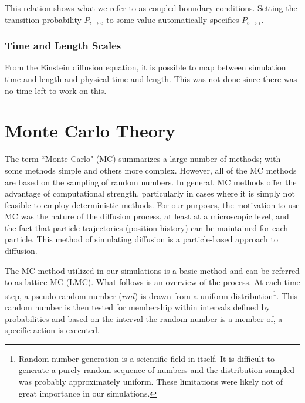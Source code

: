 	This relation shows what we refer to as coupled boundary conditions. Setting the transition probability $ P_{i \rightarrow e} $ to some value automatically specifies $ P_{e \rightarrow i} $.

\subsubsection{Time and Length Scales}

	From the Einstein diffusion equation, it is possible to map between simulation time and length and physical time and length. This was not done since there was no time left to work on this.

\clearpage
\section{Monte Carlo Theory}
\label{sec:intro-mc}
	
	The term ``Monte Carlo" (MC) summarizes a large number of methods; with some methods simple and others more complex. However, all of the MC methods are based on the sampling of random numbers. In general, MC methods offer the advantage of computational strength, particularly in cases where it is simply not feasible to employ deterministic methods. For our purposes, the motivation to use MC was the nature of the diffusion process, at least at a microscopic level, and the fact that particle trajectories (position history) can be maintained for each particle. This method of simulating diffusion is a particle-based approach to diffusion.
	
	The MC method utilized in our simulations is a basic method and can be referred to as lattice-MC (LMC).  What follows is an overview of the process. At each time step, a pseudo-random number ($ rnd $) is drawn from a uniform distribution\footnote{Random number generation is a scientific field in itself. It is difficult to generate a purely random sequence of numbers and the distribution sampled was probably approximately uniform. These limitations were likely not of great importance in our simulations.}. This random number is then tested for membership within intervals defined by probabilities and based on the interval the random number is a member of, a specific action is executed.
	

